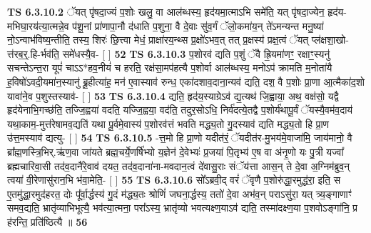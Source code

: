 \documentclass[17pt]{extarticle}
\begin{document}
                  \newline
                                \textbf{ TS 6.3.10.2} \newline
                  ॅयत् पृ॑षदा॒ज्यं प॒शोः खलु॒ वा आल॑ब्धस्य॒ हृद॑यमा॒त्माऽभि समे॑ति॒ यत् पृ॑षदा॒ज्येन॒ हृद॑य-मभिघा॒रय॑त्या॒त्मन्ने॒व प॑शू॒नां प्रा॑णापा॒नौ द॑धाति प॒शुना॒ वै दे॒वाः सु॑व॒र्गं ॅलो॒कमा॑य॒न् ते॑ऽमन्यन्त मनु॒ष्या॑ नो॒ऽन्वाभ॑विष्य॒न्तीति॒ तस्य॒ शिरः॑ छि॒त्त्वा मेधं॒ प्राक्षा॑रय॒न्थ्स प्र॒क्षो॑ऽभव॒त् तत् प्र॒क्षस्य॑ प्रक्ष॒त्वं ॅयत् प्ल॑क्षशा॒खो-त्त॑रब॒र्॒.हि-र्भव॑ति॒ समे॑धस्यै॒व- [  ] \textbf{  52} \newline
                  \newline
                                \textbf{ TS 6.3.10.3} \newline
                  प॒शोरव॑ द्यति प॒शुं ॅवै ह्रि॒यमा॑णꣳ॒॒ रक्षाꣳ॒॒स्यनु॑ सचन्तेऽन्त॒रा यूपं॑ चाऽऽ*हव॒नीयं॑ च हरति॒ रक्ष॑सा॒मप॑हत्यै प॒शोर्वा आल॑ब्धस्य॒ मनोऽप॑ क्रामति म॒नोता॑यै ह॒विषो॑ऽवदी॒यमा॑न॒स्यानु॑ ब्रू॒हीत्या॑ह॒ मन॑ ए॒वास्याव॑ रुन्ध॒ एका॑दशाव॒दाना॒न्यव॑ द्यति॒ दश॒ वै प॒शोः प्रा॒णा आ॒त्मैका॑द॒शो यावा॑ने॒व प॒शुस्तस्याव॑- [  ] \textbf{  53} \newline
                  \newline
                                \textbf{ TS 6.3.10.4} \newline
                  द्यति॒ हृद॑य॒स्याग्रेऽव॑ द्य॒त्यथ॑ जि॒ह्वाया॒ अथ॒ वक्ष॑सो॒ यद्वै हृद॑येनाभि॒गच्छ॑ति॒ तज्जि॒ह्वया॑ वदति॒ यज्जि॒ह्वया॒ वद॑ति॒ तदुर॒सोऽधि॒ निर्व॑दत्ये॒तद्वै प॒शोर्य॑थापू॒र्वं ॅयस्यै॒वम॑व॒दाय॑ यथा॒काम॒-मुत्त॑रेषामव॒द्यति॑ यथा पू॒र्वमे॒वास्य॑ प॒शोरव॑त्तं भवति मद्ध्य॒तो गु॒दस्याव॑ द्यति मद्ध्य॒तो हि प्रा॒ण उ॑त्त॒मस्याव॑ द्यत्यु- [  ] \textbf{  54} \newline
                  \newline
                                \textbf{ TS 6.3.10.5} \newline
                  -त्त॒मो हि प्रा॒णो यदीत॑रं॒ ॅयदीत॑र-मु॒भय॑मे॒वाजा॑मि॒ जाय॑मानो॒ वै ब्रा᳚ह्म॒णस्त्रि॒भिर्.ऋ॑ण॒वा जा॑यते ब्रह्म॒चर्ये॒णर्षि॑भ्यो य॒ज्ञेन॑ दे॒वेभ्यः॑ प्र॒जया॑ पि॒तृभ्य॑ ए॒ष वा अ॑नृ॒णो यः पु॒त्री यज्वा᳚ ब्रह्मचारिवा॒सी तद॑व॒दानै॑रे॒वाव॑ दयत॒ तद॑व॒दाना॑ना-मवदान॒त्वं दे॑वासु॒राः संॅय॑त्ता आस॒न् ते दे॒वा अ॒ग्निम॑ब्रुव॒न् त्वया॑ वी॒रेणासु॑रान॒भि भ॑वा॒मेति॒- [  ] \textbf{  55} \newline
                  \newline
                                \textbf{ TS 6.3.10.6} \newline
                  सो᳚ऽब्रवी॒द् वरं॑ ॅवृणै प॒शोरु॑द्धा॒रमुद्ध॑रा॒ इति॒ स ए॒तमु॑द्धा॒रमुद॑हरत॒ दोः पू᳚र्वा॒र्द्धस्य॑ गु॒दं म॑द्ध्य॒तः श्रोणिं॑ जघना॒र्द्धस्य॒ ततो॑ दे॒वा अभ॑व॒न् पराऽसु॑रा॒ यत् त्र्य॒ङ्गाणाꣳ॑ समव॒द्यति॒ भ्रातृ॑व्याभिभूत्यै॒ भव॑त्या॒त्मना॒ परा᳚ऽस्य॒ भ्रातृ॑व्यो भवत्यक्ष्ण॒याऽव॑ द्यति॒ तस्मा॑दक्ष्ण॒या प॒शवोऽङ्गा॑नि॒ प्र ह॑रन्ति॒ प्रति॑ष्ठित्यै ॥ \textbf{  56 } \newline
\end{document}
